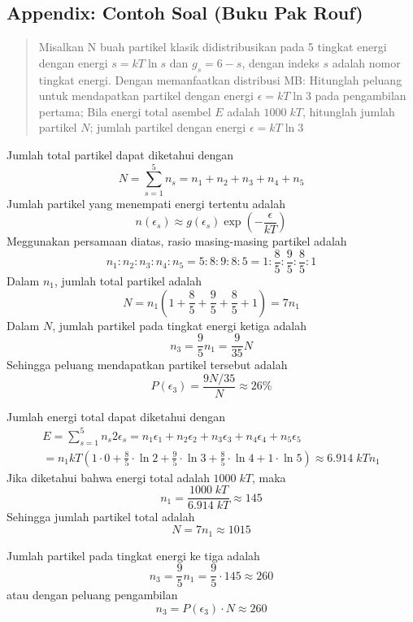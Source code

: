 \documentclass[../../../Main.tex]{subfiles}
\begin{document}
\subsection{Appendix: Contoh Soal (Buku Pak Rouf)}
\begin{quotation}
    Misalkan N buah partikel klasik didistribusikan pada 5 tingkat energi dengan energi $s = kT \ln s$ dan $g_s = 6-s$, dengan indeks $s$ adalah nomor tingkat energi. Dengan memanfaatkan distribusi MB: Hitunglah peluang untuk mendapatkan partikel dengan energi $\epsilon = kT \ln 3$ pada pengambilan pertama; Bila energi total asembel $E$ adalah $1000 \;kT$, hitunglah jumlah partikel $N$; jumlah partikel dengan energi $\epsilon=kT \ln 3$
\end{quotation}

Jumlah total partikel dapat diketahui dengan 
\begin{equation*}
    N=\sum_{s=1}^{5}n_s=n_1+n_2+n_3+n_4+n_5
\end{equation*}
Jumlah partikel yang menempati energi tertentu adalah
\begin{equation*}
    n(\epsilon_s)\approx g(\epsilon_s)\exp\left(-\frac{\epsilon}{kT}\right)
\end{equation*}
Meggunakan persamaan diatas, rasio masing-masing partikel adalah
\begin{equation*}
    n_1:n_2:n_3:n_4:n_5=5:8:9:8:5=1:\frac{8}{5}:\frac{9}{5}:\frac{8}{5}:1
\end{equation*} 
Dalam $n_1$, jumlah total partikel adalah
\begin{equation*}
    N=n_1\left(1+\frac{8}{5}+\frac{9}{5}+\frac{8}{5}+1\right)=7n_1
\end{equation*}
Dalam $N$, jumlah partikel pada tingkat energi ketiga adalah
\begin{equation*}
    n_3=\frac{9}{5}n_1=\frac{9}{35}N
\end{equation*}
Sehingga peluang mendapatkan partikel tersebut adalah
\begin{equation*}
    P(\epsilon_3)=\frac{9N/35}{N}\approx26\%
\end{equation*}

Jumlah energi total dapat diketahui dengan
\begin{multline*}
    E=\sum_{s=1}^{5}n_s2\epsilon_s=n_1\epsilon_1+n_2\epsilon_2+n_3\epsilon_3+n_4\epsilon_4+n_5\epsilon_5 \\
    =n_1kT\left(1\cdot0+\frac{8}{5}\cdot\ln 2+\frac{9}{5}\cdot\ln 3+\frac{8}{5}\cdot\ln 4+1\cdot\ln 5\right)\approx6.914\;kTn_1
\end{multline*}
Jika diketahui bahwa energi total adalah $1000\;kT$, maka 
\begin{equation*}
    n_1=\frac{1000\;kT}{6.914\;kT}\approx145
\end{equation*}
Sehingga jumlah partikel total adalah
\begin{equation*}
    N=7n_1\approx1015
\end{equation*}

Jumlah partikel pada tingkat energi ke tiga adalah
\begin{equation*}
    n_3=\frac{9}{5}n_1=\frac{9}{5}\cdot145\approx260
\end{equation*}
atau dengan peluang pengambilan
\begin{equation*}
    n_3=P(\epsilon_3)\cdot N\approx 260
\end{equation*}
\end{document}
